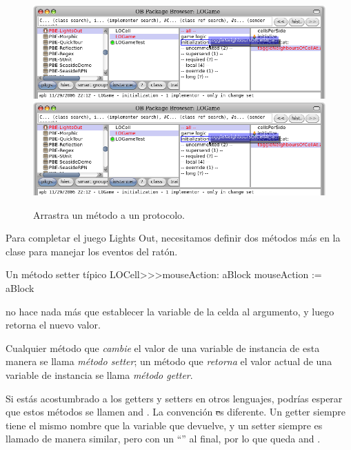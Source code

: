 \documentclass[a4paper,10pt,twoside]{book}
\begin{document}
\begin{figure}[htbp]
   \centering
   \ifluluelse
		{\includegraphics[width=\textwidth]{DragMethod} }
		{\includegraphics[scale=0.7]{DragMethod} }
   \caption{Arrastra un m\'etodo a un protocolo.}
\end{figure}

Para completar el juego Lights Out, necesitamos definir dos m\'etodos m\'as en la clase  para manejar los eventos del rat\'on.

\begin{method}[mouseAction:]{Un m\'etodo setter t\'ipico}
LOCell>>>mouseAction: aBlock
   mouseAction := aBlock
\end{method}

 no hace nada m\'as que establecer la variable  de la celda al argumento, y luego retorna el nuevo valor.

Cualquier m\'etodo que \emph{cambie} el valor de una variable de instancia de esta manera se llama \emph{m\'etodo setter}; un m\'etodo que \emph{retorna} el valor actual de una variable de instancia se llama \emph{m\'etodo getter}.

Si est\'as acostumbrado a los getters y setters en otros lenguajes, podr\'ias esperar que estos m\'etodos se  llamen  and .
La convenci\'on \st es diferente. 
Un getter siempre tiene el mismo nombre que la variable que devuelve, y un setter siempre es llamado de manera similar, pero con un ``\ct{:}'' al final, por lo que queda  and .
\end{document}
